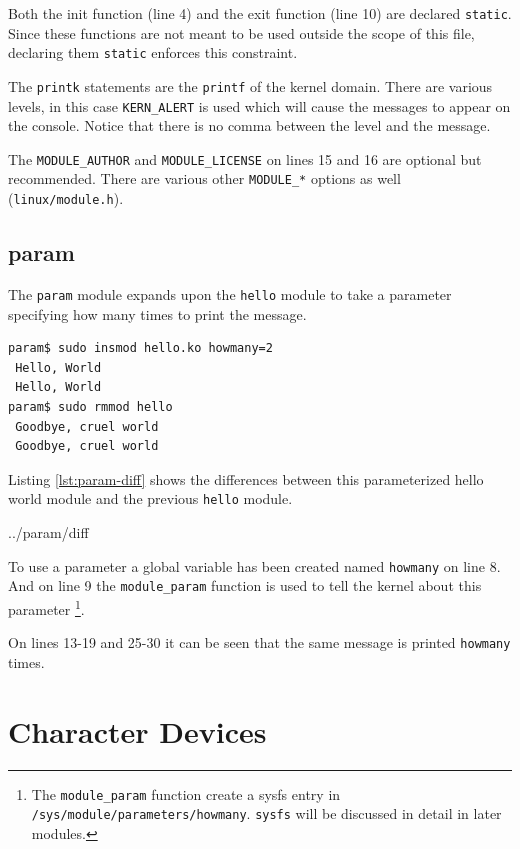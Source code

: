 \documentclass{article}
\begin{document}
Both the init function (line 4) and the exit function (line 10)
are declared \verb+static+.
Since these functions are not meant to be used outside the scope
of this file, declaring them \verb+static+ enforces this
constraint\autocite[Pg. 52]{corbet2009linux}.

The \verb+printk+ statements are the \verb+printf+ of the
kernel domain.  There are various levels, in this case
\verb+KERN_ALERT+ is used which will cause the messages
to appear on the console.  Notice that there is no comma
between the level and the message.

The \verb+MODULE_AUTHOR+ and \verb+MODULE_LICENSE+ on lines 15 and 16
are optional but recommended\autocite[Pg. 51]{corbet2009linux}.
There are various other \verb+MODULE_*+
options as well (\verb+linux/module.h+).

\clearpage
\subsection{param}

The \verb+param+ module expands upon the \verb+hello+ module to
take a parameter specifying how many times to print the message.

\begin{verbatim}
param$ sudo insmod hello.ko howmany=2
 Hello, World
 Hello, World
param$ sudo rmmod hello
 Goodbye, cruel world
 Goodbye, cruel world
\end{verbatim}

Listing \ref{lst:param-diff} shows the differences between this
parameterized hello world module and the previous \verb+hello+ module.


	{../param/diff}

To use a parameter a global variable has been created named \verb+howmany+
on line 8.
And on line 9 the \verb+module_param+ function is used to tell
the kernel about this parameter
\footnote{The \verb+module_param+ function create a sysfs entry
in \verb+/sys/module/parameters/howmany+.  \verb+sysfs+ will
be discussed in detail in later modules.}.

On lines 13-19 and 25-30 it can be seen that the same message
is printed \verb+howmany+ times.

\section{Character Devices}
\end{document}
